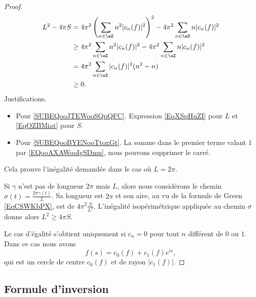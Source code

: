 \begin{proof}
	\begin{subequations}
		\begin{align}
			L^2-4\pi S & =4\pi^2\left( \sum_{n\in \eZ}n^2| c_n(f) |^2 \right)^2-4\pi^2\sum_{n\in \eZ}n| c_n(f) |^2       \label{SUBEQooJTEWooSQpQFC} \\
			           & \geq 4\pi^2\sum_{n\in \eZ}n^2| c_n(f) |^2-4\pi^2\sum_{n\in \eZ}n| c_n(f) |^2      \label{SUBEQooBYENooTtoxGt}               \\
			           & =4\pi^2\sum_{n\in \eZ}| c_n(f) |^2(n^2-n)                                                                                   \\
			           & \geq 0.
		\end{align}
	\end{subequations}
	Justifications.
	\begin{itemize}
		\item Pour \eqref{SUBEQooJTEWooSQpQFC}. Expression \eqref{EqXSpHuZI} pour \( L\) et \eqref{EqOZBMiat} pour \( S\).
		\item Pour \eqref{SUBEQooBYENooTtoxGt}. La somme dans le premier terme valant \( 1\) par \eqref{EQooAXAWooIgSDmu}, nous pouvons supprimer le carré.
	\end{itemize}
	Cela prouve l'inégalité demandée dans le cas où \( L=2\pi\).

	Si \( \gamma\) n'est pas de longueur \( 2\pi\) mais \( L\), alors nous considérons le chemin \( \sigma(t)=\frac{ 2\pi\gamma(t) }{ L }\). Sa longueur est \( 2\pi\) et son aire, au vu de la formule de Green \eqref{EqCSWKbPX}, est de \( 4\pi^2\frac{ S }{ L^2 }\). L'inégalité isopérimétrique appliquée au chemin \( \sigma\) donne alors \( L^2\geq 4\pi S\).

	Le cas d'égalité s'obtient uniquement si \( c_n=0\) pour tout \( n\) différent de \( 0\) ou \( 1\). Dans ce cas nous avons
	\begin{equation}
		f(s)=c_0(f)+c_1(f) e^{is},
	\end{equation}
	qui est un cercle de centre \( c_0(f)\) et de rayon \( | c_1(f) |\).
\end{proof}


\subsection{Formule d'inversion}


